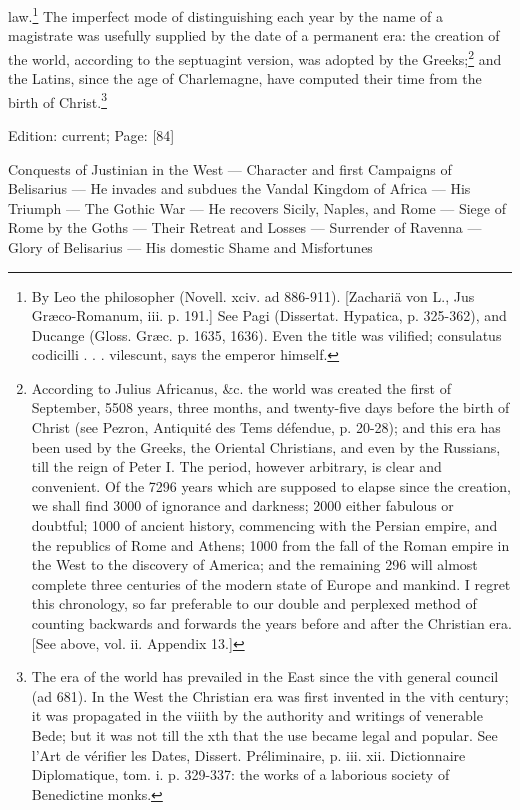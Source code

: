 law.\footnote{By Leo the philosopher (Novell. xciv. ad 886-911). [Zachariä von L., Jus Græco-Romanum, iii. p. 191.] See Pagi (Dissertat. Hypatica, p. 325-362), and Ducange (Gloss. Græc. p. 1635, 1636). Even the title was vilified; consulatus codicilli . . . vilescunt, says the emperor himself.} The imperfect mode of distinguishing each year by the name of a magistrate was usefully supplied by the date of a permanent era: the creation of the world, according to the septuagint version, was adopted by the Greeks;\footnote{According to Julius Africanus, \&c. the world was created the first of September, 5508 years, three months, and twenty-five days before the birth of Christ (see Pezron, Antiquité des Tems défendue, p. 20-28); and this era has been used by the Greeks, the Oriental Christians, and even by the Russians, till the reign of Peter I. The period, however arbitrary, is clear and convenient. Of the 7296 years which are supposed to elapse since the creation, we shall find 3000 of ignorance and darkness; 2000 either fabulous or doubtful; 1000 of ancient history, commencing with the Persian empire, and the republics of Rome and Athens; 1000 from the fall of the Roman empire in the West to the discovery of America; and the remaining 296 will almost complete three centuries of the modern state of Europe and mankind. I regret this chronology, so far preferable to our double and perplexed method of counting backwards and forwards the years before and after the Christian era. [See above, vol. ii. Appendix 13.]} and the Latins, since the age of Charlemagne, have computed their time from the birth of Christ.\footnote{The era of the world has prevailed in the East since the vith general council (ad 681). In the West the Christian era was first invented in the vith century; it was propagated in the viiith by the authority and writings of venerable Bede; but it was not till the xth that the use became legal and popular. See l\texthebrew{}’Art de vérifier les Dates, Dissert. Préliminaire, p. iii. xii. Dictionnaire Diplomatique, tom. i. p. 329-337: the works of a laborious society of Benedictine monks.}

Edition: current; Page: [84]


Conquests of Justinian in the West \texthebrew{—} Character and first Campaigns of Belisarius \texthebrew{—} He invades and subdues the Vandal Kingdom of Africa \texthebrew{—} His Triumph \texthebrew{—} The Gothic War \texthebrew{—} He recovers Sicily, Naples, and Rome \texthebrew{—} Siege of Rome by the Goths \texthebrew{—} Their Retreat and Losses \texthebrew{—} Surrender of Ravenna \texthebrew{—} Glory of Belisarius \texthebrew{—} His domestic Shame and Misfortunes


